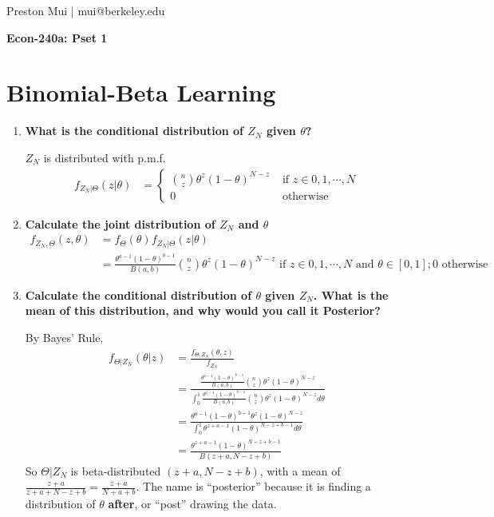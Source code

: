 \documentclass{article}[12pt]
\begin{document}
\begin{center}
	Preston Mui | mui@berkeley.edu

	{\bf Econ-240a: Pset 1}
\end{center}

\setcounter{section}{1}

\section{Binomial-Beta Learning}
\begin{enumerate}
	\item \textbf{What is the conditional distribution of $Z_N$ given $\theta$?}
	
	$Z_N$ is distributed with p.m.f.
	\begin{align*}
	    f_{Z_N | \Theta}(z | \theta) &= \begin{cases}
	    \binom{n}{z} \theta^z (1-\theta)^{N - z} &\mbox{ if $z \in 0, 1, \cdots, N$} \\
	    0 &\mbox{ otherwise}
	    \end{cases}
	\end{align*}

	\item \textbf{Calculate the joint distribution of $Z_N$ and $\theta$}
	\begin{align*}
	    f_{Z_N,\Theta}(z,\theta) &= f_{\Theta}(\theta) f_{Z_N | \Theta}(z|\theta) \\
	    &= \frac{\theta^{a-1}(1-\theta)^{b-1}}{B(a,b)} \binom{n}{z} \theta^z (1-\theta)^{N - z} \mbox{ if $z \in 0, 1, \cdots, N$ and $\theta \in [0,1]$}; 0 \mbox{ otherwise} 
	\end{align*}

	\item \textbf{Calculate the conditional distribution of $\theta$ given $Z_N$. What is the mean of this distribution, and why would you call it Posterior?}

	By Bayes' Rule,
	\begin{align*}
	    f_{\Theta | Z_N}(\theta | z) &= \frac{f_{\Theta, Z_N}(\theta,z)}{f_{Z_N}}\\
	    &= \frac{\frac{\theta^{a-1}(1-\theta)^{b-1}}{B(a,b)} \binom{n}{z} \theta^z (1-\theta)^{N - z}}{\int_{0}^{1} \frac{\theta^{a-1}(1-\theta)^{b-1}}{B(a,b)} \binom{n}{z} \theta^z (1-\theta)^{N - z} d\theta}\\
	    &= \frac{\theta^{a-1}(1-\theta)^{b-1} \theta^z (1-\theta)^{N - z}}{\int_{0}^{1} \theta^{z+a-1}(1-\theta)^{N-z+b-1} d\theta} \\
	    &= \frac{\theta^{z+a-1}(1-\theta)^{N-z+b-1}}{B(z+a,N-z+b)}
	\end{align*}
	So $\Theta | Z_N$ is beta-distributed $(z+a,N-z+b)$, with a mean of $\frac{z+a}{z+a+N-z+b} = \frac{z+a}{N+a+b}$. The name is ``posterior'' because it is finding a distribution of $\theta$ \textbf{after}, or ``post'' drawing the data.


\end{enumerate}
\end{document}
